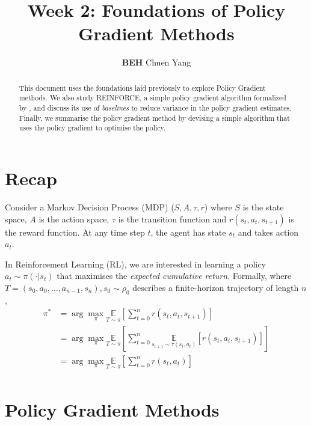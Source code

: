 \documentclass{article} %
\title{Week 2: Foundations of Policy Gradient Methods}
\author{\textbf{BEH} Chuen Yang}
\begin{document}
\ifcolmsubmission
\linenumbers
\fi

\maketitle

\begin{abstract}
This document uses the foundations laid previously to explore Policy Gradient methods.
We also study REINFORCE, a simple policy gradient algorithm formalized by \cite{Williams-1992},
and discuss its use of \textit{baselines} to reduce variance in the policy gradient estimates.
Finally, we summarise the policy gradient method by devising a simple algorithm that uses the policy gradient to optimise the policy.
\end{abstract}

\section{Recap}

Consider a Markov Decision Process (MDP) ($S, A, \tau, r$) where $S$ is the state space, $A$ is the action space, 
$\tau$ is the transition function and $r(s_t, a_t, s_{t + 1})$ is the reward function.
At any time step $t$, the agent has state $s_t$ and takes action $a_t$.

In Reinforcement Learning (RL), we are interested in learning a policy $a_t \sim \pi(\cdot | s_t)$ that maximises the 
\textit{expected cumulative return}.
Formally, where $T = (s_0, a_0, \dots, a_{n - 1}, s_n), s_0 \sim \rho_0$ describes a finite-horizon trajectory of length $n$,
\begin{equation} \label{mdp_obj}
    \begin{aligned}
    \pi^* & = \arg\max_\pi \underset{T \sim \pi}{\mathbb{E}} \left[ \sum_{t=0}^{n} r(s_t, a_t, s_{t + 1}) \right] \\
          & = \arg\max_\pi \underset{T \sim \pi}{\mathbb{E}} \left[ \sum_{t=0}^{n}  \underset{s_{t + 1} \sim \tau  (s_t, a_t)}{\mathbb{E}}[r(s_t, a_t, s_{t + 1})]\right] \\
          & = \arg\max_\pi \underset{T \sim \pi}{\mathbb{E}} \left[ \sum_{t=0}^{n}  r(s_t, a_t)\right] \\
    \end{aligned}
\end{equation}

\section{Policy Gradient Methods}
\end{document}
